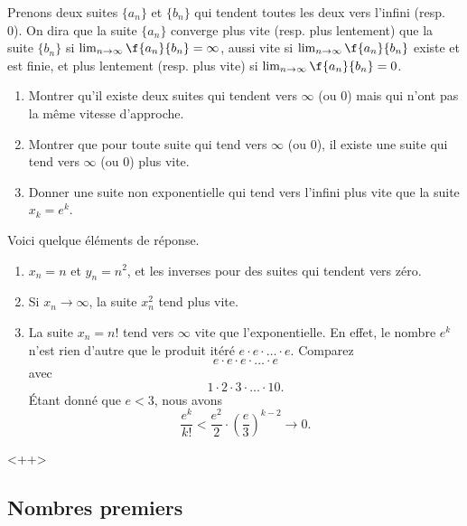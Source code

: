 \begin{example}     \label{EXooGESBooQYOCpk}
    
Prenons deux suites $\{a_n\}$ et  $\{b_n\}$ qui tendent toutes les deux vers l'infini (resp. 0). On dira que la suite $\{a_n\}$ converge plus vite (resp. plus lentement) que la suite $\{b_n\}$ si $\lim_{n\rightarrow \infty}\f{a_n}{b_n} = \infty$, aussi vite si $\lim_{n\rightarrow \infty}\f{a_n}{b_n} $ existe et est finie, et plus lentement (resp. plus vite)  si $\lim_{n\rightarrow \infty}\f{a_n}{b_n} = 0$.
\begin{enumerate}
	\item Montrer qu'il existe deux suites qui tendent vers $\infty$ (ou 0) mais qui n'ont pas la même  vitesse d'approche.
	\item Montrer que pour toute suite qui tend vers  $\infty$ (ou 0), il existe une suite qui tend vers  $\infty$ (ou 0) plus vite.
	\item Donner une suite non exponentielle qui tend vers l'infini plus vite que la suite $x_k = e^k$.
\end{enumerate}

Voici quelque éléments de réponse.

\begin{enumerate}
\item $x_n=n$ et $y_n=n^2$, et les inverses pour des suites qui tendent vers zéro.
\item Si $x_n\to\infty$, la suite $x_n^2$ tend plus vite.
\item La suite $x_n=n!$ tend vers \( \infty\) vite que l'exponentielle. En effet, le nombre $e^k$ n'est rien d'autre que le produit itéré $e\cdot e\cdot\ldots\cdot e$. Comparez
\begin{equation}
	e\cdot e\cdot e\cdot\ldots\cdot e
\end{equation}
avec
\begin{equation}
	1\cdot 2\cdot 3\cdot\ldots\cdot 10.
\end{equation}
Étant donné que $e<3$, nous avons
\begin{equation}
	\frac{ e^k }{ k! }<\frac{ e^2 }{ 2 }\cdot\left( \frac{ e }{ 3 } \right)^{k-2}\to 0.
\end{equation}

\end{enumerate}
\end{example}
<++>

\subsection{Nombres premiers}


